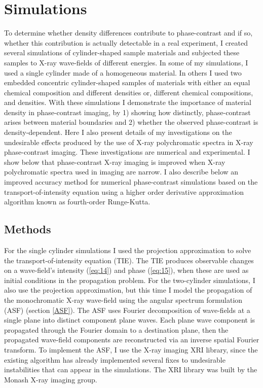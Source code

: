 \documentclass[10pt, a4paper, singlespacing]{report}
\begin{document}
\chapter{Simulations}\label{Simulations}
To determine whether density differences contribute to phase-contrast and if so, whether this contribution is actually detectable in a real experiment, I created several simulations of cylinder-shaped sample materials and subjected these samples to X-ray wave-fields of different energies. In some of my simulations, I used a single cylinder made of a homogeneous material. In others I used two embedded concentric cylinder-shaped samples of materials with either an equal chemical composition and different densities or, different chemical compositions, and densities. With these simulations I demonstrate the importance of material density in phase-contrast imaging,  by 1) showing how distinctly, phase-contrast arises between material boundaries and 2) whether the observed phase-contrast is density-dependent. 
Here I also present details of my investigations on the undesirable effects produced by the use of X-ray polychromatic spectra in X-ray phase-contrast imaging.
These investigations are numerical and experimental. I show below that phase-contrast X-ray imaging is improved when X-ray polychromatic spectra used in imaging are narrow.
I also describe below an improved accuracy method for numerical phase-contrast simulations based on the transport-of-intensity equation using a higher order derivative approximation algorithm known as fourth-order Runge-Kutta.

\section{Methods}\label{Methods}
For the single cylinder simulations I used the projection approximation to solve the transport-of-intensity equation (TIE). The TIE produces observable changes on a wave-field's intensity (\ref{eq:14}) and phase (\ref{eq:15}), when these are used as initial conditions in the propagation problem. For the two-cylinder simulations, I also use the projection approximation, but this time I model the propagation of the monochromatic X-ray wave-field using the angular spectrum formulation (ASF) (section \ref{ASF}). The ASF uses Fourier decomposition of wave-fields at a single plane into distinct component plane waves. Each plane wave component is propagated through the Fourier domain to a destination plane, then the propagated wave-field components are reconstructed via an inverse spatial Fourier transform\cite{Goodman}. To implement the ASF, I use the X-ray imaging XRI library, since the existing algorithm has already implemented several fixes to undesirable instabilities that can appear in the simulations. The XRI library was built by the Monash X-ray imaging group.
\end{document}
